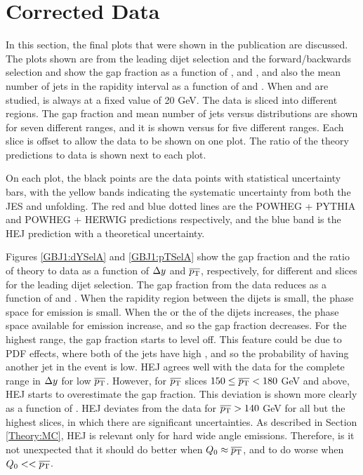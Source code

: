 \section{Corrected Data}
\label{sec:GBJ1:FinalPlots}

In this section, the final plots that were shown in the publication are discussed. 
The plots shown are from  the leading \pt{} dijet selection and the forward/backwards selection and show the gap fraction as a function of \dy{}, \ptb{} and \qz{}, and also the mean number of jets in the rapidity interval as a function of \dy{} and \ptb{}. 
When \dy{} and \ptb{} are studied, \qz{} is always at a fixed value of 20 GeV. 
The data is sliced into different regions. 
The gap fraction and mean number of jets versus \dy{} distributions are shown for seven different \ptb{} ranges, and it is shown versus \ptb{} for five different \dy{} ranges. 
Each slice is offset to allow the data to be shown on one plot. 
The ratio of the theory predictions to data is shown next to each plot.

On each plot, the black points are the data points with statistical uncertainty bars, with the yellow bands indicating the systematic uncertainty from both the JES and unfolding. 
The red and blue dotted lines are the POWHEG + PYTHIA and POWHEG + HERWIG predictions respectively, and the blue band is the HEJ prediction with a theoretical uncertainty.

Figures \ref{GBJ1:dYSelA} and \ref{GBJ1:pTSelA} show the gap fraction and the ratio of theory to data as a function of $\mbox{$\Delta y$}{}$ and $\mbox{$\overline{p_{\rm T}}$}{}$, respectively, for different \ptb{} and \dy{} slices for the leading \pt{} dijet selection. 
The gap fraction from the data reduces as a function of \ptb{} and \dy{}.
When the rapidity region between the dijets is small, the phase space for emission is small. 
When the \dy{} or the \ptb{} of the dijets increases, the phase space available for emission increase, and so the gap fraction decreases.
For the highest \ptb{} range, the gap fraction starts to level off. 
This feature could be due to PDF effects, where both of the jets have high \pt{}, and so the probability of having another jet in the event is low.
HEJ agrees well with the data for the complete range in $\mbox{$\Delta y$}$ for low $\mbox{$\overline{p_{\rm T}}$}{}$. 
However, for $\mbox{$\overline{p_{\rm T}}$}{}$ slices $150\le\mbox{$\overline{p_{\rm T}}$}{}<180$ GeV and above, HEJ starts to overestimate the gap fraction.
This deviation is shown more clearly as a function of \ptb{}.
HEJ deviates from the data for $\mbox{$\overline{p_{\rm T}}$}{}>140$ GeV for all but the highest \dy{} slices, in which there are significant uncertainties.
As described in Section \ref{Theory:MC}, HEJ is relevant only for hard wide angle emissions.
Therefore, is it not unexpected that it should do better when $\mbox{$Q_0$}{}\approx\mbox{$\overline{p_{\rm T}}$}{}$, and to do worse when $Q_{0}<<\mbox{$\overline{p_{\rm T}}$}{}$.

